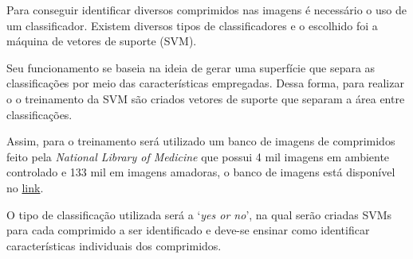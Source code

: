 Para conseguir identificar diversos comprimidos nas imagens é necessário o uso de um classificador. Existem diversos tipos de classificadores e o escolhido foi a máquina de vetores de suporte (SVM). 

Seu funcionamento se baseia na ideia de gerar uma superfície que separa as classificações por meio das características empregadas. Dessa forma, para realizar o o treinamento da SVM são criados vetores de suporte que separam a área entre classificações.

Assim, para o treinamento será utilizado um banco de imagens de comprimidos feito pela \textit{National Library of Medicine} que possui 4 mil imagens em ambiente controlado e 133 mil em imagens amadoras, o banco de imagens está disponível no  \href{https://www.nlm.nih.gov/databases/download/data_distrib_main.html}{link}. 

O tipo de classificação utilizada será a `\textit{yes or no}', na qual serão criadas SVMs para cada comprimido a ser identificado e deve-se ensinar como identificar características individuais dos comprimidos.


